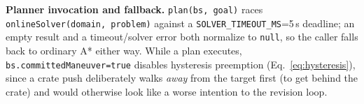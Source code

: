 \documentclass[11pt,a4paper]{article}
\renewcommand{\paragraph}[1]{\par\smallskip\noindent\textbf{#1}}
\begin{document}
\paragraph{Planner invocation and fallback.} \texttt{plan(bs, goal)} races
\texttt{onlineSolver(domain, problem)} against a \texttt{SOLVER\_}\allowbreak\texttt{TIMEOUT\_MS}=5\,s deadline;
an empty result and a timeout/solver error both normalize to \texttt{null}, so the caller falls
back to ordinary A* either way. While a plan executes, \texttt{bs.committedManeuver=true}
disables hysteresis preemption (Eq.~\ref{eq:hysteresis}), since a crate push deliberately walks
\emph{away} from the target first (to get behind the crate) and would otherwise look like a
worse intention to the revision loop.
\end{document}
